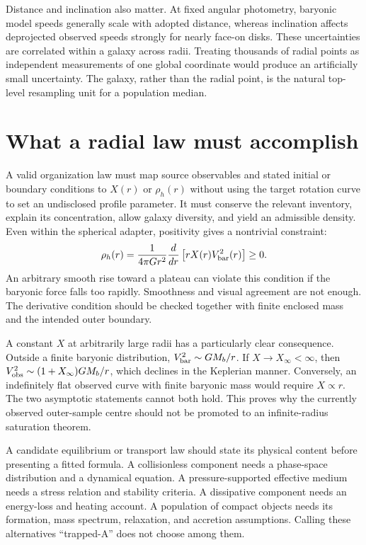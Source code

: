 Distance and inclination also matter. At fixed angular photometry, baryonic model speeds generally scale with adopted distance, whereas inclination affects deprojected observed speeds strongly for nearly face-on disks. These uncertainties are correlated within a galaxy across radii. Treating thousands of radial points as independent measurements of one global coordinate would produce an artificially small uncertainty. The galaxy, rather than the radial point, is the natural top-level resampling unit for a population median.

\section{What a radial law must accomplish}

A valid organization law must map source observables and stated initial or boundary conditions to $X(r)$ or $\rho_h(r)$ without using the target rotation curve to set an undisclosed profile parameter. It must conserve the relevant inventory, explain its concentration, allow galaxy diversity, and yield an admissible density. Even within the spherical adapter, positivity gives a nontrivial constraint:
\begin{equation}
 \rho_h(r)=\frac{1}{4\pi Gr^2}
 \frac{d}{dr}\left[rX(r)V_{\rm bar}^2(r)\right]\geq0.
 \label{c10:densitytest}
\end{equation}
An arbitrary smooth rise toward a plateau can violate this condition if the baryonic force falls too rapidly. Smoothness and visual agreement are not enough. The derivative condition should be checked together with finite enclosed mass and the intended outer boundary.

A constant $X$ at arbitrarily large radii has a particularly clear consequence. Outside a finite baryonic distribution, $V_{\rm bar}^2\sim GM_b/r$. If $X\to X_\infty<\infty$, then $V_{\rm obs}^2\sim(1+X_\infty)GM_b/r$, which declines in the Keplerian manner. Conversely, an indefinitely flat observed curve with finite baryonic mass would require $X\propto r$. The two asymptotic statements cannot both hold. This proves why the currently observed outer-sample centre should not be promoted to an infinite-radius saturation theorem.

A candidate equilibrium or transport law should state its physical content before presenting a fitted formula. A collisionless component needs a phase-space distribution and a dynamical equation. A pressure-supported effective medium needs a stress relation and stability criteria. A dissipative component needs an energy-loss and heating account. A population of compact objects needs its formation, mass spectrum, relaxation, and accretion assumptions. Calling these alternatives ``trapped-A'' does not choose among them.

